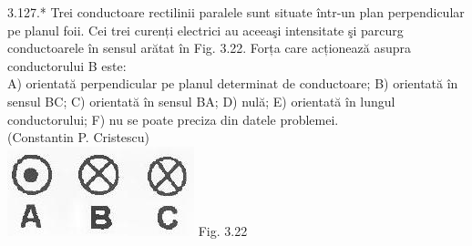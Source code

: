\documentclass[10pt]{article}
\begin{document}
3.127.* Trei conductoare rectilinii paralele sunt situate într-un plan perpendicular pe planul foii. Cei trei curenți electrici au aceeaşi intensitate şi parcurg conductoarele în sensul arătat în Fig. 3.22. Forța care acționează asupra conductorului B este:\\ A) orientată perpendicular pe planul determinat de conductoare; B) orientată în sensul BC; C) orientată în sensul BA; D) nulă; E) orientată în lungul conductorului; F) nu se poate preciza din datele problemei.\\ (Constantin P. Cristescu)\\ \includegraphics[max width=\textwidth, center]{2025_07_01_5b3ff9fa0d508c8e9f17g-171} Fig. 3.22\\
\end{document}
